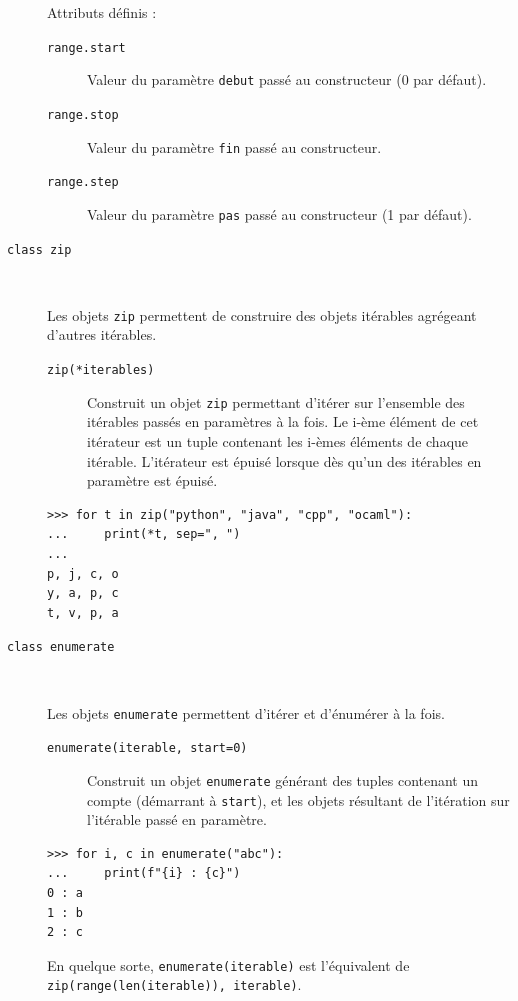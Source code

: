 \documentclass[a4paper, 10pt]{article}
\begin{document}
\begin{description}
    Attributs définis :
    \begin{description}
        \item[\texttt{range.start}] Valeur du paramètre \texttt{debut} passé au constructeur (0 par défaut).
        \item[\texttt{range.stop}] Valeur du paramètre \texttt{fin} passé au constructeur.
        \item[\texttt{range.step}] Valeur du paramètre \texttt{pas} passé au constructeur (1 par défaut).
    \end{description}


    \item[\texttt{class zip}]~
    
    Les objets \texttt{zip} permettent de construire des objets itérables agrégeant d'autres itérables.

    \begin{description}
        \item[\texttt{zip(*iterables)}] Construit un objet \texttt{zip} permettant d'itérer sur l'ensemble des itérables passés en paramètres à la fois. Le i-ème élément de cet itérateur est un tuple contenant les i-èmes éléments de chaque itérable. L'itérateur est épuisé lorsque dès qu'un des itérables en paramètre est épuisé.
    \end{description}

    \begin{verbatim}
>>> for t in zip("python", "java", "cpp", "ocaml"):
...     print(*t, sep=", ")
... 
p, j, c, o
y, a, p, c
t, v, p, a
    \end{verbatim}

    \item[\texttt{class enumerate}]~
    
    Les objets \texttt{enumerate} permettent d'itérer et d'énumérer à la fois.

    \begin{description}
        \item[\texttt{enumerate(iterable, start=0)}] Construit un objet \texttt{enumerate} générant des tuples contenant un compte (démarrant à \texttt{start}), et les objets résultant de l'itération sur l'itérable passé en paramètre.
    \end{description}
    

    \begin{verbatim}
>>> for i, c in enumerate("abc"):
...     print(f"{i} : {c}")
0 : a
1 : b
2 : c
    \end{verbatim}

    En quelque sorte, \texttt{enumerate(iterable)} est l'équivalent de \texttt{zip(range(len(iterable)), iterable)}.

\end{description}
\end{document}

